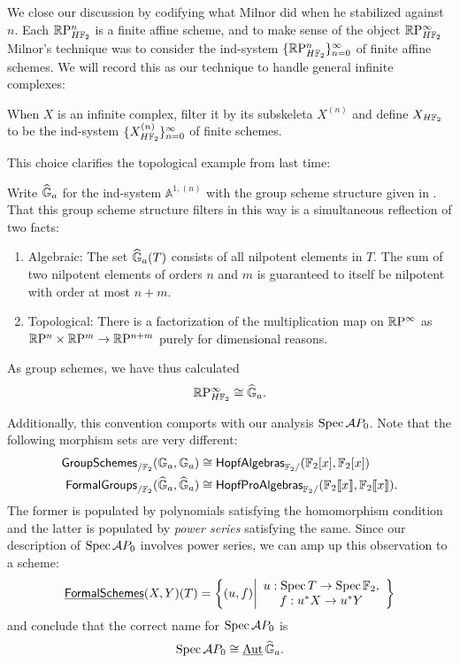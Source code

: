 We close our discussion by codifying what Milnor did when he stabilized against $n$.  Each $\mathbb R\mathrm P^n_{H\mathbb F_2}$ is a finite affine scheme, and to make sense of the object $\mathbb R\mathrm P^\infty_{H\mathbb F_2}$ Milnor's technique was to consider the ind-system $\{\mathbb R\mathrm P^n_{H\mathbb F_2}\}_{n=0}^\infty$ of finite affine schemes.  We will record this as our technique to handle general infinite complexes:
\begin{definition}
When $X$ is an infinite complex, filter it by its subskeleta $X^{(n)}$ and define $X_{H\mathbb F_2}$ to be the ind-system $\{X^{(n)}_{H\mathbb F_2}\}_{n=0}^\infty$ of finite schemes.
\end{definition}

This choice clarifies the topological example from last time:
\begin{example}\label{RPinftyExampleForReal}
Write $\widehat{\mathbb G}_a$ for the ind-system $\mathbb A^{1, (n)}$ with the group scheme structure given in .  That this group scheme structure filters in this way is a simultaneous reflection of two facts:
\begin{enumerate}
\item Algebraic: The set $\widehat{\mathbb G}_a(T)$ consists of all nilpotent elements in $T$.  The sum of two nilpotent elements of orders $n$ and $m$ is guaranteed to itself be nilpotent with order at most $n+m$.
\item Topological: There is a factorization of the multiplication map on $\mathbb R\mathrm P^\infty$ as $\mathbb R\mathrm P^n \times \mathbb R\mathrm P^m \to \mathbb R\mathrm P^{n+m}$ purely for dimensional reasons.
\end{enumerate}
As group schemes, we have thus calculated \[\mathbb R\mathrm P^\infty_{H\mathbb F_2} \cong \widehat{\mathbb G}_a.\]
\end{example}

\begin{example}
Additionally, this convention comports with our analysis $\operatorname{Spec} \mathcal AP_0$.  Note that the following morphism sets are very different:
\begin{align*}
\mathsf{GroupSchemes}_{/\mathbb F_2}(\mathbb G_a, \mathbb G_a) & \cong \mathsf{HopfAlgebras}_{\mathbb F_2/}(\mathbb F_2[x], \mathbb F_2[x]) \\
\mathsf{FormalGroups}_{/\mathbb F_2}(\widehat{\mathbb G}_a, \widehat{\mathbb G}_a) & \cong \mathsf{HopfProAlgebras}_{\mathbb F_2/}(\mathbb F_2\llbracket x \rrbracket, \mathbb F_2\llbracket x \rrbracket).
\end{align*}
The former is populated by polynomials satisfying the homomorphism condition and the latter is populated by \emph{power series} satisfying the same.  Since our description of $\operatorname{Spec} \mathcal AP_0$ involves power series, we can amp up this observation to a scheme: \[\operatorname{\underline{\smash{\mathsf{FormalSchemes}}}}(X, Y)(T) = \left\{ (u, f) \middle| \begin{array}{c} u: \operatorname{Spec} T \to \operatorname{Spec} \mathbb F_2, \\ f: u^* X \to u^* Y \end{array}\right\}\] and conclude that the correct name for $\operatorname{Spec} \mathcal AP_0$ is \[\operatorname{Spec} \mathcal AP_0 \cong \operatorname{\underline{\smash{\operatorname{Aut}}}} \widehat{\mathbb G}_a.\]
\end{example}

